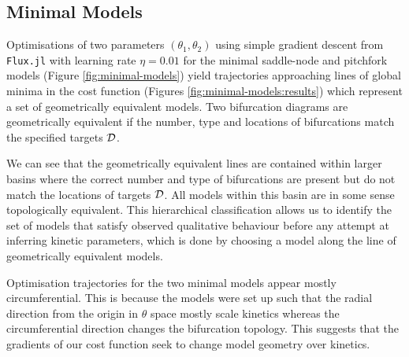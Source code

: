 \documentclass{article}
\begin{document}
\subsection{Minimal Models}
Optimisations of two parameters $(\theta_1,\theta_2)$ using simple gradient descent from \texttt{Flux.jl} with learning rate $\eta=0.01$ for the minimal saddle-node and pitchfork models (Figure \ref{fig:minimal-models}) yield trajectories approaching lines of global minima in the cost function (Figures \ref{fig:minimal-models:results}) which represent a set of geometrically equivalent models. Two bifurcation diagrams are geometrically equivalent if the number, type and locations of bifurcations match the specified targets $\mathcal{D}$.

We can see that the geometrically equivalent lines are contained within larger basins where the correct number and type of bifurcations are present but do not match the locations of targets $\mathcal{D}$. All models within this basin are in some sense topologically equivalent. This hierarchical classification allows us to identify the set of models that satisfy observed qualitative behaviour \cite{Stumpf2019ParameterBifurcations} before any attempt at inferring kinetic parameters, which is done by choosing a model along the line of geometrically equivalent models.

Optimisation trajectories for the two minimal models appear mostly circumferential. This is because the models were set up such that the radial direction from the origin in $\theta$ space mostly scale kinetics whereas the circumferential direction changes the bifurcation topology. This suggests that the gradients of our cost function seek to change model geometry over kinetics.
\end{document}
